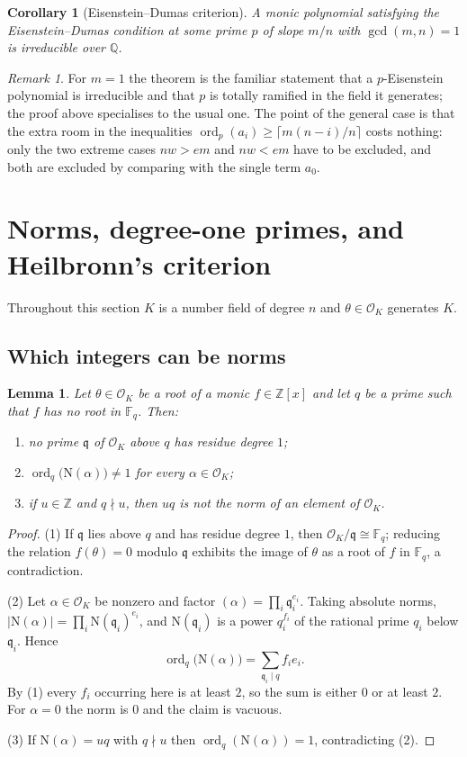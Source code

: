 \documentclass[11pt,reqno]{amsart}
\theoremstyle{plain}
\newtheorem{lemma}[theorem]{Lemma}
\newtheorem{corollary}[theorem]{Corollary}
\theoremstyle{definition}
\theoremstyle{remark}
\newtheorem{remark}[theorem]{Remark}
\newcommand{\Z}{\mathbb{Z}}
\newcommand{\Q}{\mathbb{Q}}
\newcommand{\F}{\mathbb{F}}
\newcommand{\OK}{\mathcal{O}_K}
\newcommand{\ord}{\operatorname{ord}}
\newcommand{\q}{\mathfrak{q}}
\newcommand{\N}{\mathrm{N}}
\begin{document}
\begin{corollary}[Eisenstein--Dumas criterion]\label{cor:dumas-irr}
A monic polynomial satisfying the Eisenstein--Dumas condition at some prime $p$ of slope $m/n$
with $\gcd(m,n)=1$ is irreducible over $\Q$.
\end{corollary}

\begin{remark}
For $m=1$ the theorem is the familiar statement that a $p$-Eisenstein polynomial is irreducible
and that $p$ is totally ramified in the field it generates; the proof above specialises to the
usual one. The point of the general case is that the extra room in the inequalities
$\ord_p(a_i)\ge \lceil m(n-i)/n \rceil$ costs nothing: only the two extreme cases $nw>em$ and
$nw<em$ have to be excluded, and both are excluded by comparing with the single term $a_0$.
\end{remark}

\section{Norms, degree-one primes, and Heilbronn's criterion}\label{sec:heilbronn}

Throughout this section $K$ is a number field of degree $n$ and $\theta\in\OK$ generates $K$.

\subsection{Which integers can be norms}

\begin{lemma}\label{lem:degree-one}
Let $\theta\in\OK$ be a root of a monic $f\in\Z[x]$ and let $q$ be a prime such that $f$ has no
root in $\F_q$. Then:
\begin{enumerate}
\item no prime $\q$ of $\OK$ above $q$ has residue degree $1$;
\item $\ord_q\bigl(\N(\alpha)\bigr)\ne1$ for every $\alpha\in\OK$;
\item if $u\in\Z$ and $q\nmid u$, then $uq$ is not the norm of an element of $\OK$.
\end{enumerate}
\end{lemma}

\begin{proof}
(1) If $\q$ lies above $q$ and has residue degree $1$, then $\OK/\q\cong\F_q$; reducing the
relation $f(\theta)=0$ modulo $\q$ exhibits the image of $\theta$ as a root of $f$ in $\F_q$, a
contradiction.

(2) Let $\alpha\in\OK$ be nonzero and factor $(\alpha)=\prod_i\q_i^{e_i}$. Taking absolute norms,
$|\N(\alpha)|=\prod_i \N(\q_i)^{e_i}$, and $\N(\q_i)$ is a power $q_i^{f_i}$ of the rational prime
$q_i$ below $\q_i$. Hence
\[
  \ord_q\bigl(\N(\alpha)\bigr)=\sum_{\q_i\mid q} f_i e_i .
\]
By (1) every $f_i$ occurring here is at least $2$, so the sum is either $0$ or at least $2$. For
$\alpha=0$ the norm is $0$ and the claim is vacuous.

(3) If $\N(\alpha)=uq$ with $q\nmid u$ then $\ord_q(\N(\alpha))=1$, contradicting (2).
\end{proof}
\end{document}
